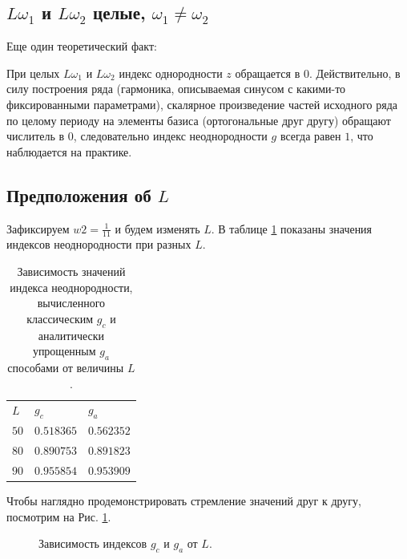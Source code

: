 \documentclass[specialist, substylefile = spbu.rtx,
			   subf, href, 12pt]{disser}
\begin{document}
\subsection{$L\omega_1$ и $L\omega_2 $ целые, $\omega_1 \neq \omega_2 $}
Еще один теоретический факт: 

При целых $L\omega_1$ и $L\omega_2 $ индекс однородности $ z $ обращается в 0. Действительно, в силу построения ряда (гармоника, описываемая синусом с какими-то фиксированными параметрами), скалярное произведение частей исходного ряда по целому периоду на элементы базиса (ортогональные друг другу) обращают числитель в 0, следовательно индекс неоднородности $ g $ всегда равен $ 1 $, что наблюдается на практике.


\subsection{Предположения об $ L $}

Зафиксируем $ w2 = \frac{1}{11} $ и будем изменять $ L $. В таблице \ref{tab:L_vs_g_c_vs_g_a} показаны значения индексов неоднородности при разных $ L $.

\begin{table}[!hhh]
	\centering
	\caption{Зависимость значений индекса неоднородности, вычисленного классическим $ g_c $ и аналитически упрощенным $ g_a $ способами от величины $ L $.}
	\begin{tabular}{lll}
		$ L $  & $ g_c $     & $ g_a $       \\
		$ 50 $ & $ 0.518365 $ & $ 0.562352 $ \\
		$ 80 $ & $ 0.890753 $ & $ 0.891823 $ \\
		$ 90 $ & $ 0.955854 $ & $ 0.953909 $
	\end{tabular}
\label{tab:L_vs_g_c_vs_g_a}
\end{table}


Чтобы наглядно продемонстрировать стремление значений друг к другу, посмотрим на Рис. \ref{pic:g_c_vs_g_a_from_L}.
\begin{figure}[!hhh]
	\caption{Зависимость индексов $ g_c $ и $ g_a $ от $ L $.}
	\label{pic:g_c_vs_g_a_from_L}
\end{figure}
\end{document}
